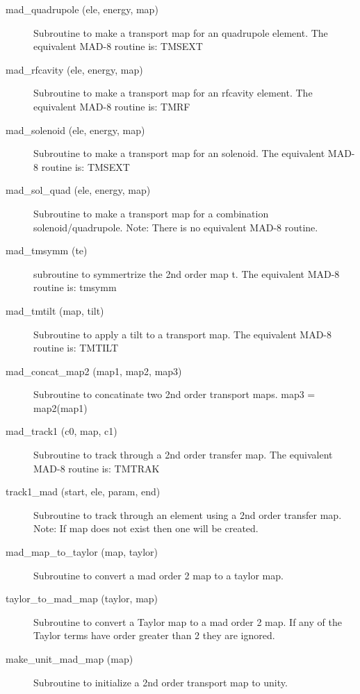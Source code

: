 \begin{description}
\item[mad\_quadrupole (ele, energy, map)] \Newline 
     Subroutine to make a transport map for an quadrupole element.
     The equivalent MAD-8 routine is: TMSEXT

\item[mad\_rfcavity (ele, energy, map)] \Newline 
     Subroutine to make a transport map for an rfcavity element.
     The equivalent MAD-8 routine is: TMRF

\item[mad\_solenoid (ele, energy, map)] \Newline 
     Subroutine to make a transport map for an solenoid.
     The equivalent MAD-8 routine is: TMSEXT

\item[mad\_sol\_quad (ele, energy, map)] \Newline 
     Subroutine to make a transport map for a combination solenoid/quadrupole.
     Note: There is no equivalent MAD-8 routine.

\item[mad\_tmsymm (te)] \Newline 
     subroutine to symmertrize the 2nd order map t.
     The equivalent MAD-8 routine is: tmsymm

\item[mad\_tmtilt (map, tilt)] \Newline 
     Subroutine to apply a tilt to a transport map.
     The equivalent MAD-8 routine is: TMTILT

\item[mad\_concat\_map2 (map1, map2, map3)] \Newline 
     Subroutine to concatinate two 2nd order transport maps.
         map3 = map2(map1)

\item[mad\_track1 (c0, map, c1)] \Newline 
     Subroutine to track through a 2nd order transfer map.
     The equivalent MAD-8 routine is: TMTRAK

\item[track1\_mad (start, ele, param, end)] \Newline 
     Subroutine to track through an element using a 2nd order transfer map.
     Note: If map does not exist then one will be created. 

\item[mad\_map\_to\_taylor (map, taylor)] \Newline 
     Subroutine to convert a mad order 2 map to a taylor map.

\item[taylor\_to\_mad\_map (taylor, map)] \Newline 
     Subroutine to convert a Taylor map to a mad order 2 map.
     If any of the Taylor terms have order greater than 2 they are ignored.

\item[make\_unit\_mad\_map (map)] \Newline 
     Subroutine to initialize a 2nd order transport map to unity.


\end{description}

